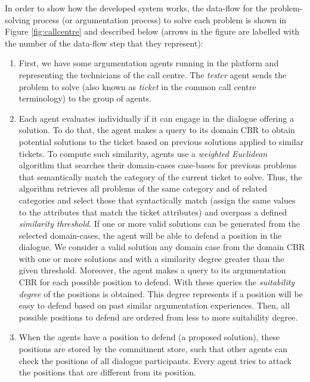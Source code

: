 In order to show how the developed system works, the data-flow for the problem-solving process (or argumentation process) to solve each problem is shown in Figure \ref{fig:callcentre} and described below (arrows in the figure are labelled with the number of the data-flow step that they represent):
\begin{enumerate}
 \item First, we have some argumentation agents running in the platform and representing the technicians of the call centre. The \emph{tester} agent sends the problem to solve (also known as \emph{ticket} in the common call centre terminology) to the group of agents.
 \item Each agent evaluates individually if it can engage in the dialogue offering a solution. To do that, the agent makes a query to its domain CBR to obtain potential solutions to the ticket based on previous solutions applied to similar tickets. To compute such similarity, agents use a \emph{weighted Euclidean} algorithm that searches their domain-cases case-bases for previous problems that semantically match the category of the current ticket to solve. Thus, the algorithm retrieves all problems of the same category and of related categories and select those that syntactically match (assign the same values to the attributes that match the ticket attributes) and overpass a defined \emph{similarity threshold}. If one or more valid solutions can be generated from the selected domain-cases, the agent will be able to defend a position in the dialogue. We consider a valid solution any domain case from the domain CBR with one or more solutions and with a similarity degree greater than the given threshold. Moreover, the agent makes a query to its argumentation CBR for each possible position to defend. With these queries the \emph{suitability degree} of the positions is obtained. This degree represents if a position will be easy to defend based on past similar argumentation experiences. Then, all possible positions to defend are ordered from less to more suitability degree.
 \item When the agents have a position to defend (a proposed solution), these positions are stored by the commitment store, such that other agents can check the positions of all dialogue participants. Every agent tries to attack the positions that are different from its position.

\end{enumerate}
